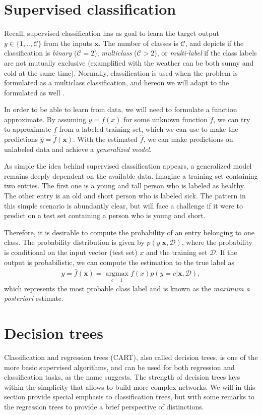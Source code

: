 \section{Supervised classification}

Recall, supervised classification has as goal to learn the target output $y \in \{1,..,\mathcal{C}\}$ from the inputs $\textbf{x}$. The number of classes is $\mathcal{C}$, and depicts if the classification is \textit{binary} ($\mathcal{C}=2$), \textit{multiclass} ($\mathcal{C}>2$), or \textit{multi-label} if the class labels are not mutually exclusive (examplified with the weather can be both sunny and cold at the same time). Normally, classification is used when the problem is formulated as a multiclass classification, and hereon we will adapt to the formulated as well \cite{Murphy2012}.

In order to be able to learn from data, we will need to formulate a function approximate. By assuming $y = f(x)$ for some unknown function $f$, we can try to approximate $f$ from a labeled training set, which we can use to make the predictions $\hat{y}=\hat{f}(\textbf{x})$. With the estimated $\hat{f}$, we can make predictions on unlabeled data and achieve a \textit{generalized model}.

As simple the idea behind supervised classification appears, a generalized model remains deeply dependent on the available data. Imagine a training set containing two entries. The first one is a young and tall person who is labeled as healthy. The other entry is an old and short person who is labeled sick. The pattern in this simple scenario is abundantly clear, but will face a challenge if it were to predict on a test set containing a person who is young and short.

Therefore, it is desirable to compute the probability of an entry belonging to one class. The probability distribution is given by $p(y|\textbf{x}, \mathcal{D})$, where the probability is conditional on the input vector (test set) $x$ and the training set $\mathcal{D}$. If the output is probabilistic, we can compute the estimation to the true label as
\begin{align}
  \hat{y} = \hat{f}(\textbf{x}) = \operatorname*{argmax}_{c=1} f(x) p(y = c|\textbf{x}, \mathcal{D}),
\end{align}
which represents the most probable class label and is known as the \textit{maximum a posteriori} estimate.

\section{Decision trees}
Classification and regression trees (CART), also called decision trees, is one of the more basic supervised algorithms, and can be used for both regression and classification tasks, as the name suggests. The strength of decision trees lays within the simplicity that allows to build more complex networks. We will in this section provide special emphasis to classification trees, but with some remarks to the regression trees to provide a brief perspective of distinctions.

